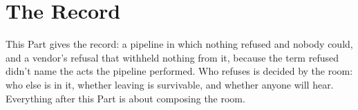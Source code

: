\part{The Record}

This Part gives the record: a pipeline in which nothing refused and nobody could, and a vendor's refusal that withheld nothing from it, because the term refused didn't name the acts the pipeline performed. Who refuses is decided by the room: who else is in it, whether leaving is survivable, and whether anyone will hear. Everything after this Part is about composing the room.
